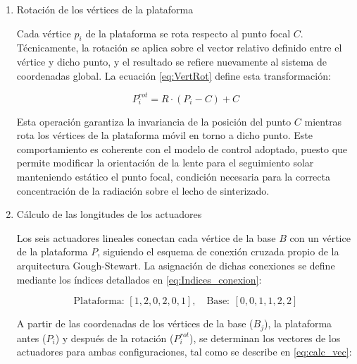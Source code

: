 \begin{enumerate}
La orientación final de la plataforma se obtiene mediante la composición intrínseca $Z-Y-X$, que aplica primero la rotación en $Z$, luego en $Y$ y finalmente en $X$. Se muestra la expresión de la matriz de rotación combinada $R$ en la ecuación \eqref{eq:MatRot}.

\begin{equation}
R=R_z(\psi)\cdot R_y(\theta)\cdot R_x(\phi)
\label{eq:MatRot}
\end{equation}

	\item{Rotación de los vértices de la plataforma}

Cada vértice $p_i$ de la plataforma se rota respecto al punto focal $C$. Técnicamente, la rotación se aplica sobre el vector relativo definido entre el vértice y dicho punto, y el resultado se refiere nuevamente al sistema de coordenadas global. La ecuación \eqref{eq:VertRot} define esta transformación:

\begin{equation}
P^{rot}_i=R\cdot\left(P_i-C\right)+C
\label{eq:VertRot}
\end{equation}

Esta operación garantiza la invariancia de la posición del punto $C$ mientras rota los vértices de la plataforma móvil en torno a dicho punto. Este comportamiento es coherente con el modelo de control adoptado, puesto que permite modificar la orientación de la lente para el seguimiento solar manteniendo estático el punto focal, condición necesaria para la correcta concentración de la radiación sobre el lecho de sinterizado.

	\item{Cálculo de las longitudes de los actuadores}

Los seis actuadores lineales conectan cada vértice de la base $B$ con un vértice de la plataforma $P$, siguiendo el esquema de conexión cruzada propio de la arquitectura Gough-Stewart. La asignación de dichas conexiones se define mediante los índices detallados en \eqref{eq:Indices_conexion}:

\begin{equation}
\text{Plataforma: }[1,2,0,2,0,1],\quad\mathrm{Base:~}[0,0,1,1,2,2]
\label{eq:Indices_conexion}
\end{equation}

A partir de las coordenadas de los vértices de la base ($B_j$), la plataforma antes ($P_i$) y después de la rotación ($P_i^{rot}$), se determinan los vectores de los actuadores para ambas configuraciones, tal como se describe en \eqref{eq:calc_vec}:


\end{enumerate}
